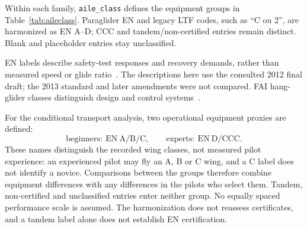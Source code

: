 Within each family, \texttt{aile\_class} defines the equipment groups in
Table~\ref{tab:aileclass}. Paraglider EN and legacy LTF codes, such as
\enquote{C ou 2}, are harmonized as EN A--D; CCC and tandem/non-certified entries
remain distinct. Blank and placeholder entries stay unclassified.

EN labels describe safety-test responses and recovery demands, rather than
measured speed or glide ratio~\cite{fpren926_2_2012}. The descriptions here use
the consulted 2012 final draft; the 2013 standard and later amendments were not
compared. FAI hang-glider classes distinguish design and control
systems~\cite{fai_sc7_2024}.

For the conditional transport analysis, two operational equipment proxies are defined:
\[
 \text{beginners}:\ \mathrm{EN\ A/B/C},\qquad
 \text{experts}:\ \mathrm{EN\ D/CCC}.
\]
These names distinguish the recorded wing classes, not measured pilot experience:
an experienced pilot may fly an A, B or C wing, and a C label does not identify a
novice. Comparisons between the groups therefore combine equipment differences
with any differences in the pilots who select them. Tandem, non-certified and
unclassified entries enter neither group. No equally spaced performance scale is
assumed.
The harmonization does not reassess certificates, and a tandem label alone does
not establish EN certification.

